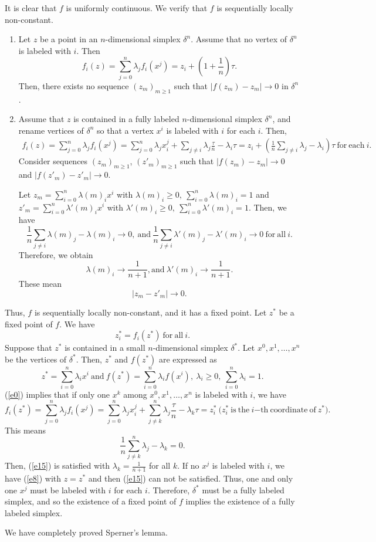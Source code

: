 \documentclass[reqno]{amsart}
\begin{document}
It is clear that $f$ is uniformly continuous. We verify that $f$ is sequentially locally non-constant.
\begin{enumerate}
\item Let $z$ be a point in an $n$-dimensional simplex $\delta^n$. Assume that no vertex of $\delta^n$ is labeled with $i$. Then
\begin{equation}
f_i(z)=\sum_{j=0}^n\lambda_jf_i(x^j)=z_i+\left(1+\frac{1}{n}\right)\tau.\label{e8}
\end{equation}
Then, there exists no sequence $(z_m)_{m\geq 1}$ such that $|f(z_m)-z_m|\longrightarrow 0$ in $\delta^n$.
\item Assume that $z$ is contained in a fully labeled $n$-dimensional simplex $\delta^n$, and rename vertices of $\delta^n$ so that a vertex $x^i$ is labeled with $i$ for each $i$. Then,
\begin{align*}
f_i(z)=\sum_{j=0}^n\lambda_jf_i(x^j)=\sum_{j=0}^n\lambda_jx_i^j+\sum_{j\neq i}\lambda_j\frac{\tau}{n}-\lambda_i\tau=z_i+\left(\frac{1}{n}\sum_{j\neq i}\lambda_j-\lambda_i\right)\tau\ \mathrm{for\ each}\ i.
\end{align*}
Consider sequences $(z_m)_{m\geq 1}$, $(z'_m)_{m\geq 1}$ such that $|f(z_m)-z_m|\longrightarrow 0$ and $|f(z'_m)-z'_m|\longrightarrow 0$.

Let $z_m=\sum_{i=0}^n\lambda(m)_ix^i$ with $\lambda(m)_i\geq 0,\ \sum_{i=0}^n\lambda(m)_i=1$ and $z'_m=\sum_{i=0}^n\lambda'(m)_ix^i$  with $\lambda'(m)_i\geq 0,\ \sum_{i=0}^n\lambda'(m)_i=1$. Then, we have
\[\frac{1}{n}\sum_{j\neq i}\lambda(m)_j-\lambda(m)_i\longrightarrow 0,\ \mathrm{and}\ \frac{1}{n}\sum_{j\neq i}\lambda'(m)_j-\lambda'(m)_i\longrightarrow 0\ \mathrm{for\ all}\ i.\]
Therefore, we obtain
\[\lambda(m)_i\longrightarrow \frac{1}{n+1}, \mathrm{and}\ \lambda'(m)_i\longrightarrow \frac{1}{n+1}.\]
These mean
\[|z_m-z'_m|\longrightarrow 0.\]
\end{enumerate}
Thus, $f$ is sequentially locally non-constant, and it has a fixed point. Let $z^*$ be a fixed point of $f$. We have
\begin{equation}
z^*_i=f_i(z^*)\ \mathrm{for\ all}\ i.\label{e15}
\end{equation}
Suppose that $z^*$ is contained in a small $n$-dimensional simplex $\delta^*$. Let $x^0, x^1, \dots, x^n$ be the vertices of $\delta^*$. Then, $z^*$ and $f(z^*)$ are expressed as
\[z^*=\sum_{i=0}^n\lambda_ix^i\ \mathrm{and}\ f(z^*)=\sum_{i=0}^n\lambda_if(x^i),\ \lambda_i\geq 0,\ \sum_{i=0}^n\lambda_i=1.\]
(\ref{e0}) implies that if only one $x^k$ among $x^0, x^1, \dots, x^n$ is labeled with $i$, we have
\[f_i(z^*)=\sum_{j=0}^n\lambda_jf_i(x^j)=\sum_{j=0}^n\lambda_jx_i^j+\sum_{j\neq k}^n\lambda_j\frac{\tau}{n}-\lambda_k\tau=z_i^*\ \mathrm{(}z_i^*\mathrm{\ is\ the}\ i\mathrm{-th\ coordinate\ of}\ z^*\mathrm{)}.\]
This means
\[\frac{1}{n}\sum_{j\neq k}^n\lambda_j-\lambda_k=0.\]
Then, (\ref{e15}) is satisfied with $\lambda_k=\frac{1}{n+1}$ for all $k$. If no $x^j$ is labeled with $i$, we have (\ref{e8}) with $z=z^*$ and then (\ref{e15}) can not be satisfied. Thus, one and only one $x^j$ must be labeled with $i$ for each $i$. Therefore, $\delta^*$ must be a fully labeled simplex, and so the existence of a fixed point of $f$ implies the existence of a fully labeled simplex.

We have completely proved Sperner's lemma.


\end{document}
